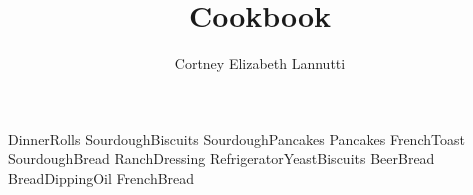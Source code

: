 \documentclass[a4paper, titlepage]{book}
\title{Cookbook}
\author{Cortney Elizabeth Lannutti}
\date{}
\begin{document}
\maketitle
{}
\tableofcontents
\newpage
{}

{DinnerRolls}
{SourdoughBiscuits}
{SourdoughPancakes}
{Pancakes}
{FrenchToast}
{SourdoughBread}
{RanchDressing}
{RefrigeratorYeastBiscuits}
{BeerBread}
{BreadDippingOil}
{FrenchBread}
\end{document}
